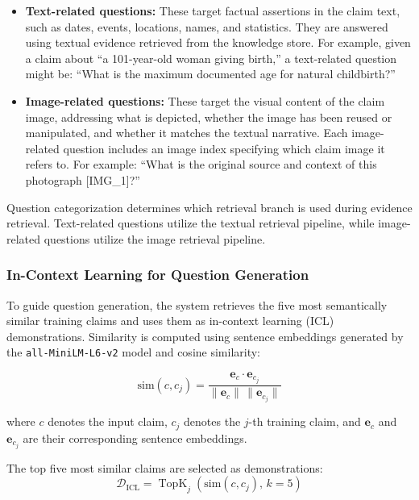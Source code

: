 \begin{itemize}
    \item \textbf{Text-related questions:} These target factual assertions in the claim text, such as dates, events, locations, names, and statistics. They are answered using textual evidence retrieved from the knowledge store. For example, given a claim about ``a 101-year-old woman giving birth,'' a text-related question might be: ``What is the maximum documented age for natural childbirth?''
    \item \textbf{Image-related questions:} These target the visual content of the claim image, addressing what is depicted, whether the image has been reused or manipulated, and whether it matches the textual narrative. Each image-related question includes an image index specifying which claim image it refers to. For example: ``What is the original source and context of this photograph [IMG\_1]?''
\end{itemize}

Question categorization determines which retrieval branch is used during evidence retrieval. Text-related questions utilize the textual retrieval pipeline, while image-related questions utilize the image retrieval pipeline.

\subsubsection{In-Context Learning for Question Generation}
\label{subsection:icl}

To guide question generation, the system retrieves the five most semantically similar training claims and uses them as in-context learning (ICL) demonstrations. Similarity is computed using sentence embeddings generated by the \texttt{all-MiniLM-L6-v2} model and cosine similarity:

\begin{equation}
\text{sim}(c,c_j)
=
\frac{\mathbf{e}_c \cdot \mathbf{e}_{c_j}}
{\|\mathbf{e}_c\| \, \|\mathbf{e}_{c_j}\|}
\label{eq:icl_cosine_similarity}
\end{equation}

where $c$ denotes the input claim, $c_j$ denotes the $j$-th training claim, and $\mathbf{e}_c$ and $\mathbf{e}_{c_j}$ are their corresponding sentence embeddings.

The top five most similar claims are selected as demonstrations:
\begin{equation}
\mathcal{D}_{\text{ICL}}
=
\operatorname{TopK}_{j}
\left(
\text{sim}(c,c_j),\, k=5
\right)
\label{eq:icl_topk}
\end{equation}

